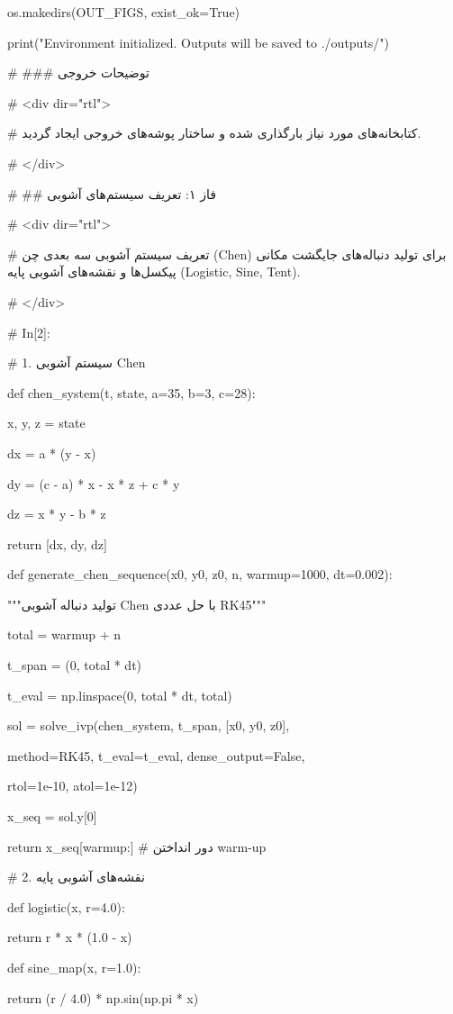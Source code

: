 os.makedirs(OUT\_FIGS, exist\_ok=True)

print("Environment initialized. Outputs will be saved to \textquotesingle./outputs/\textquotesingle")

\# \#\#\# توضیحات خروجی

\# \textless div dir="rtl"\textgreater{}

\# کتابخانه‌های مورد نیاز بارگذاری شده و ساختار پوشه‌های خروجی ایجاد گردید.

\# \textless/div\textgreater{}

\# \#\# فاز ۱: تعریف سیستم‌های آشوبی

\# \textless div dir="rtl"\textgreater{}

\# تعریف سیستم آشوبی سه بعدی چن (Chen) برای تولید دنباله‌های جایگشت مکانی پیکسل‌ها و نقشه‌های آشوبی پایه (Logistic, Sine, Tent).

\# \textless/div\textgreater{}

\# In{[}2{]}:

\# 1. سیستم آشوبی Chen

def chen\_system(t, state, a=35, b=3, c=28):

x, y, z = state

dx = a * (y - x)

dy = (c - a) * x - x * z + c * y

dz = x * y - b * z

return {[}dx, dy, dz{]}

def generate\_chen\_sequence(x0, y0, z0, n, warmup=1000, dt=0.002):

"""تولید دنباله آشوبی Chen با حل عددی RK45"""

total = warmup + n

t\_span = (0, total * dt)

t\_eval = np.linspace(0, total * dt, total)

sol = solve\_ivp(chen\_system, t\_span, {[}x0, y0, z0{]},

method=\textquotesingle RK45\textquotesingle, t\_eval=t\_eval, dense\_output=False,

rtol=1e-10, atol=1e-12)

x\_seq = sol.y{[}0{]}

return x\_seq{[}warmup:{]} \# دور انداختن warm-up

\# 2. نقشه‌های آشوبی پایه

def logistic(x, r=4.0):

return r * x * (1.0 - x)

def sine\_map(x, r=1.0):

return (r / 4.0) * np.sin(np.pi * x)

